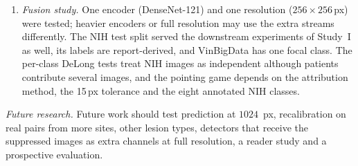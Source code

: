 \begin{enumerate}
 paediatric set with image-level labels and no patient identifiers, and its audit inserts adult nodules into children's radiographs. There
 is no lateral imaging and no reader study. On JSRT the bone overlap of each audit site came from the reference model's bone map.
 Downstream models were not tuned per input, the overlap analysis is not estimable on TBX11K, and the downstream gains are small and were
 measured with one classifier and one detector. The models are for research use only.
\item \emph{Fusion study.} One encoder (DenseNet-121) and one resolution ($256\times256$\,px) were tested; heavier encoders or full
 resolution may use the extra streams differently. The NIH test split served the downstream experiments of Study~I as well, its labels are
 report-derived, and VinBigData has one focal class. The per-class DeLong tests treat NIH images as independent although patients
 contribute several images, and the pointing game depends on the attribution method, the 15\,px tolerance and the eight annotated NIH
 classes.
\end{enumerate}

\emph{Future research.} Future work should test prediction at $1024$~px, recalibration on real pairs from more sites, other lesion types,
detectors that receive the suppressed images as extra channels at full resolution, a reader study and a prospective evaluation.
